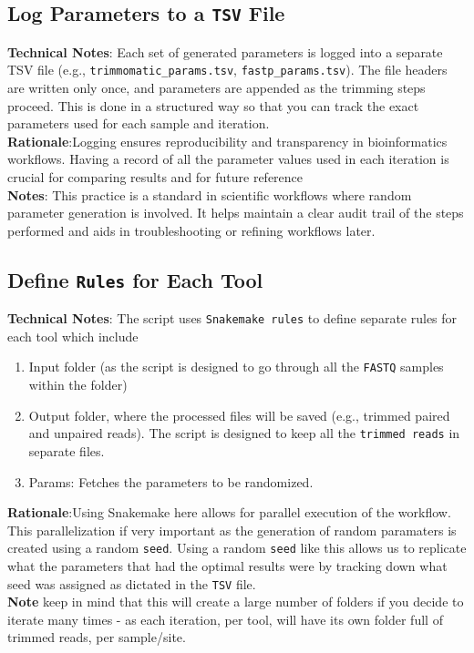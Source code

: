 \documentclass[11pt]{report}
\begin{document}
\subsection{Log Parameters to a \texttt{TSV} File}
\textbf{Technical Notes}: Each set of generated parameters is logged into a separate TSV file (e.g., \texttt{trimmomatic\_params.tsv}, \texttt{fastp\_params.tsv}). The file headers are written only once, and parameters are appended as the trimming steps proceed. This is done in a structured way so that you can track the exact parameters used for each sample and iteration.\\
\textbf{Rationale}:Logging ensures reproducibility and transparency in bioinformatics workflows. Having a record of all the parameter values used in each iteration is crucial for comparing results and for future reference
\\ \textbf{Notes}: This practice is a standard in scientific workflows where random parameter generation is involved. It helps maintain a clear audit trail of the steps performed and aids in troubleshooting or refining workflows later.

\subsection{Define \texttt{Rules} for Each Tool}
\textbf{Technical Notes}: The script uses \texttt{Snakemake rules} to define separate rules for each tool which include
	\begin{enumerate}
		\item Input folder (as the script is designed to go through all the \texttt{FASTQ} samples within the folder)
		\item Output folder, where the processed files will be saved (e.g., trimmed paired and unpaired reads). The script is designed to keep all the \texttt{trimmed reads} in separate files. 
		\item Params: Fetches the parameters to be randomized. 
	\end{enumerate} 
\textbf{Rationale}:Using Snakemake here allows for parallel execution of the workflow. This parallelization if very important as the generation of random paramaters is created using a random \texttt{seed}. Using a random \texttt{seed} like this allows us to replicate what the parameters that had the optimal results were by tracking down what seed was assigned as dictated in the \texttt{TSV} file.\\
\textbf{Note} keep in mind that this will create a large number of folders if you decide to iterate many times - as each iteration, per tool, will have its own folder full of trimmed reads, per sample/site.
\end{document}
